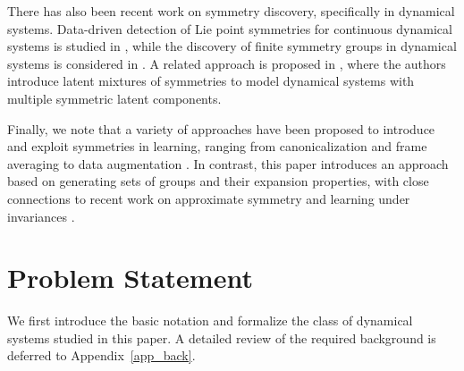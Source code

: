 \documentclass[11pt]{article}
\theoremstyle{plain}
\theoremstyle{definition}
\theoremstyle{remark}
\begin{document}
 
 




There has also been recent work on symmetry discovery, specifically in dynamical systems. Data-driven detection of Lie point symmetries for continuous dynamical systems is studied in   \citet{gabel2024data}, while the discovery of finite symmetry groups in dynamical systems is considered in \citet{calvo2025learning, calvo2025machine}. A related approach is proposed in \citet{li2025latent}, where the authors introduce latent mixtures of symmetries to model dynamical systems with multiple symmetric latent components.

Finally, we note that a variety of approaches have been proposed to introduce and exploit symmetries in learning, ranging from canonicalization \citep{kaba2023equivariance, tahmasebi2025regularity, tahmasebigeneralization, shumaylovlie} and frame averaging \citep{punyframe, atzmon2022frame, lin2024equivariance} to data augmentation \citep{tahmasebi2025data}. In contrast, this paper introduces an approach based on generating sets of groups and their expansion properties, with close connections to recent work on approximate symmetry \citep{tahmasebi2025achieving} and learning under invariances \citep{soleymanilearning, soleymani2025from}.

 







 


\section{Problem Statement}

We first introduce the basic notation and formalize the class of dynamical systems studied in this paper. A detailed review of the required background is deferred to Appendix~\ref{app_back}.

\end{document}

